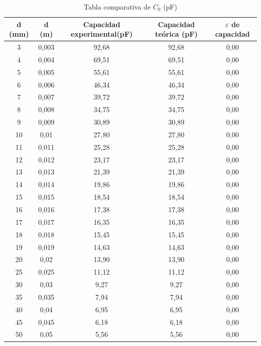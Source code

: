 \documentclass{article}
\begin{document}
   \begin{table}[H]
   \centering
   \begin{adjustbox}{max width=\columnwidth}
   \begin{tabular}{|c|c|c|c|c|}
    	\hline
        d (mm) & d (m) & Capacidad experimental(pF) & Capacidad teórica (pF) & $\varepsilon$ de capacidad \\ \hline
3	&0,003	&92,68	& 92,68    	&0,00\\
4	&0,004	&69,51	& 69,51    	&0,00\\
5	&0,005	&55,61	& 55,61    	&0,00\\
6	&0,006	&46,34	& 46,34    	&0,00\\
7	&0,007	&39,72	& 39,72    	&0,00\\
8	&0,008	&34,75	& 34,75    	&0,00\\
9	&0,009	&30,89	& 30,89    	&0,00\\
10	&0,01	&27,80	& 27,80    	&0,00\\
11	&0,011	&25,28	& 25,28    	&0,00\\
12	&0,012	&23,17	& 23,17    	&0,00\\
13	&0,013	&21,39	& 21,39    	&0,00\\
14	&0,014	&19,86	& 19,86    	&0,00\\
15	&0,015	&18,54	& 18,54    	&0,00\\
16	&0,016	&17,38	& 17,38    	&0,00\\
17	&0,017	&16,35	& 16,35    	&0,00\\
18	&0,018	&15,45	& 15,45    	&0,00\\
19	&0,019	&14,63	& 14,63    	&0,00\\
20	&0,02	&13,90	& 13,90    	&0,00\\
25	&0,025	&11,12	& 11,12    	&0,00\\
30	&0,03	&9,27	& 9,27    	&0,00\\
35	&0,035	&7,94	& 7,94    	&0,00\\
40	&0,04	&6,95	& 6,95    	&0,00\\
45	&0,045	&6,18	& 6,18    	&0,00\\
50	&0,05	&5,56	& 5,56    	&0,00\\
    \hline
	\end{tabular}
	\end{adjustbox}
	\caption{Tabla comparativa de $C_0$ (pF)}
    \end{table}
\end{document}
